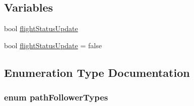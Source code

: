 \subsection*{\-Variables}
\begin{DoxyCompactItemize}
\item 
bool \hyperlink{group___path_follower_module_ga1fcb1f94a20ead02f78d415f51cabb6c}{flight\-Status\-Update}
\item 
bool \hyperlink{group___path_follower_module_ga1fcb1f94a20ead02f78d415f51cabb6c}{flight\-Status\-Update} = false
\end{DoxyCompactItemize}


\subsection{\-Enumeration \-Type \-Documentation}
\hypertarget{group___path_follower_module_ga4bbdbc4a4481bd273fb63fab3646c22b}{
\subsubsection[{path\-Follower\-Types}]{\setlength{\rightskip}{0pt plus 5cm}enum {\bf path\-Follower\-Types}}}\label{group___path_follower_module_ga4bbdbc4a4481bd273fb63fab3646c22b}
